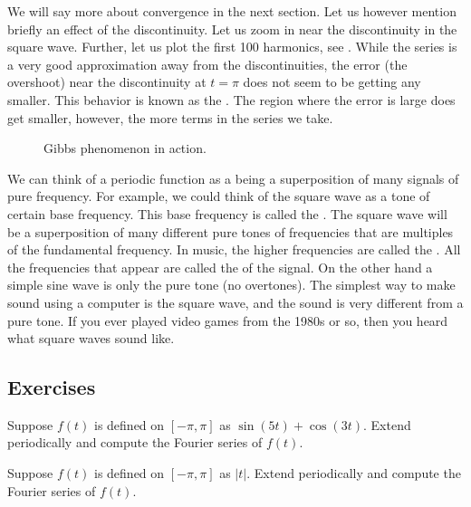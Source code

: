 We will say more about convergence in the next section.  Let us however
mention briefly an effect of the discontinuity.  Let us zoom in near the
discontinuity in the square wave.  Further, let us plot the first 100
harmonics, see
.  While the
series is a very good approximation away from the discontinuities, the error
(the overshoot)
near the discontinuity at $t=\pi$ does not seem to be getting any smaller.
This behavior is known as the \emph{}.
The region where the error is large does get smaller, however, the more
terms in the series we take.

\begin{figure}[h!t]
\capstart
\begin{center}
\caption{Gibbs phenomenon in action.\label{ts:squarewavegibbsfig}}
\end{center}
\end{figure}

We can think of a periodic function as a  being a superposition of 
many signals of pure frequency.  For example, we could think of the square
wave as a tone of certain base frequency.
This base frequency is called the
\emph{}.
The square wave
will be
a superposition of
many different pure tones of frequencies that are multiples of the
fundamental frequency.
In music,
the higher frequencies are called the \emph{}.
All the frequencies that appear are called the
\emph{} of the signal.
On the other hand a simple sine wave is only the pure tone (no overtones).  The
simplest way to make sound using a computer is the square wave, and the sound
is very different from a pure tone.  If you ever played video games
from the 1980s or so, then you heard what square waves sound like.

\subsection{Exercises}

\begin{exercise}
Suppose $f(t)$ is defined on $[-\pi,\pi]$ as $\sin (5t) + \cos (3t)$.  Extend
periodically and compute the Fourier series of $f(t)$.
\end{exercise}

\begin{exercise}
Suppose $f(t)$ is defined on $[-\pi,\pi]$ as $\lvert t \rvert$.
Extend periodically and compute the Fourier series of $f(t)$.
\end{exercise}

